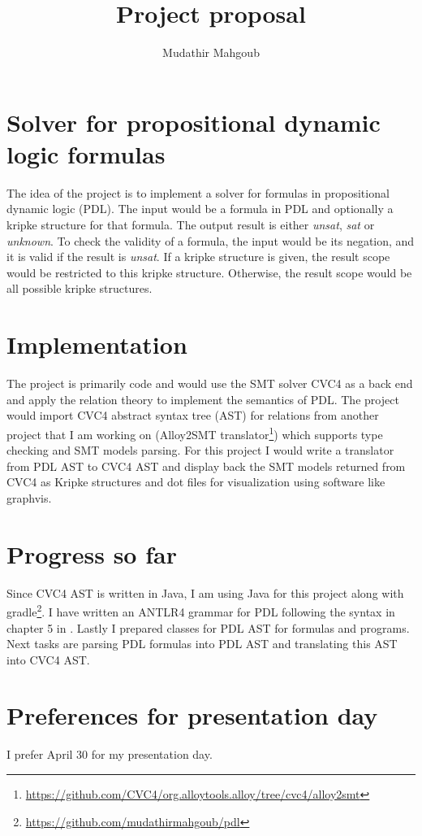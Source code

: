 \documentclass[12pt,a4paper]{article}
\author{Mudathir Mahgoub}
\title{Project proposal}
\begin{document}
\maketitle

\section{Solver for propositional dynamic logic formulas}
The idea of the project is to implement a solver for formulas in propositional dynamic logic (PDL). The input would be a formula in PDL and optionally a kripke structure for that formula. The output result is either \textit{unsat}, \textit{sat} or \textit{unknown}. To check the validity of a formula, the input would be its negation, and it is valid if the result is \textit{unsat}. If a kripke structure is given, the result scope would be restricted to this kripke structure. Otherwise, the result scope would be all possible kripke structures. 

\section{Implementation}
The project is primarily code and would use the SMT solver CVC4 as a back end and apply the relation theory to implement the semantics of PDL. The project would import CVC4 abstract syntax tree (AST) for relations from another project that I am working on (Alloy2SMT translator\footnote{\url{https://github.com/CVC4/org.alloytools.alloy/tree/cvc4/alloy2smt}}) which supports type checking and SMT models parsing. For this project I would write a translator from PDL AST to CVC4 AST and display back the SMT models returned from CVC4 as Kripke structures and dot files for visualization using software like graphvis.

\section{Progress so far}

Since CVC4 AST is written in Java, I am using Java for this project along with  gradle\footnote{\url{https://github.com/mudathirmahgoub/pdl}}. I have written an ANTLR4 grammar for PDL following the syntax in chapter 5 in \cite{dynamic}. Lastly I  prepared classes for PDL AST for formulas and programs. Next tasks are parsing PDL formulas  into PDL AST and translating this AST into CVC4 AST. 

\section{Preferences for presentation day}
I prefer April 30 for my presentation day.




\end{document}
